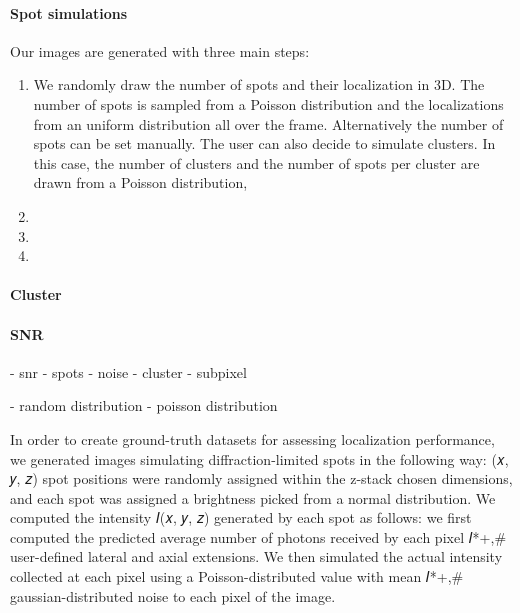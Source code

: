 \paragraph{Spot simulations}



\noindent
Our images are generated with three main steps:

\begin{enumerate}
	\item We randomly draw the number of spots and their localization in 3D.
	The number of spots is sampled from a Poisson distribution and the localizations from an uniform distribution all over the frame.
	Alternatively the number of spots can be set manually.
	The user can also decide to simulate clusters.
	In this case, the number of clusters and the number of spots per cluster are drawn from a Poisson distribution,
	\item
	\item
	\item
\end{enumerate}

\paragraph{\ac{Cluster}}


\paragraph{\ac{SNR}}


- snr
- spots
- noise
- cluster
- subpixel

- random distribution
- poisson distribution


In order to create ground-truth datasets for assessing localization performance,
we generated images simulating diffraction-limited spots in the following way: (𝑥, 𝑦, 𝑧) spot
positions were randomly assigned within the z-stack chosen dimensions, and each
spot was assigned a brightness picked from a normal distribution. We computed
the intensity 𝐼(𝑥, 𝑦, 𝑧) generated by each spot as follows: we first computed
the predicted average number of photons received by each pixel 𝐼*+,#
user-defined lateral and axial extensions. We then simulated the actual intensity
collected at each pixel using a Poisson-distributed value with mean 𝐼*+,#
gaussian-distributed noise to each pixel of the image.






